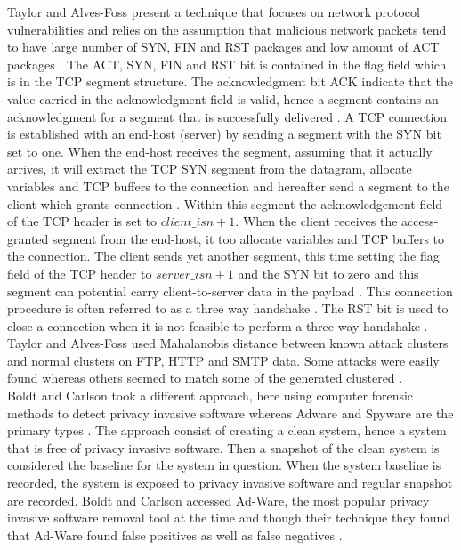 \documentclass[12pt]{article} %
\begin{document}
Taylor and Alves-Foss present a technique that focuses on network protocol vulnerabilities and relies on the assumption that malicious network packets tend to have large number of SYN, FIN and RST packages and low amount of ACT packages \cite{idika2007survey}. The ACT, SYN, FIN and RST bit is contained in the flag field which is in the TCP segment structure. The acknowledgment bit ACK indicate that the value carried in the acknowledgment field is valid, hence a segment contains an acknowledgment for a segment that is successfully delivered \cite{kurose2010computer}. A TCP connection is established with an end-host (server) by sending a segment with the SYN bit set to one. When the end-host receives the segment, assuming that it actually arrives, it will extract the TCP SYN segment from the datagram, allocate variables and TCP buffers to the connection and hereafter send a segment to the client which grants connection \cite{kurose2010computer}.  Within this segment the acknowledgement field of the TCP header is set to $client\_isn+1$. When the client receives the access-granted segment from the end-host, it too allocate variables and TCP buffers to the connection. The client sends yet another segment, this time setting the flag field of the TCP header to $server\_isn+1$ and the SYN bit to zero and this segment can potential carry client-to-server data in the payload \cite{kurose2010computer}. This connection procedure is often referred to as a three way handshake \cite{kurose2010computer}. The RST bit is used  to close a connection when it is not feasible to perform a three way handshake \cite{deri2000practical}. Taylor and Alves-Foss used Mahalanobis distance between known attack clusters and normal clusters on FTP, HTTP and SMTP data. Some attacks were easily found whereas others seemed to match some of the generated clustered \cite{idika2007survey}. \\
Boldt and Carlson took a different approach, here using computer forensic methods to detect privacy invasive software whereas Adware and Spyware are the primary types \cite{idika2007survey}. The approach consist of creating a clean system, hence a system that is free of privacy invasive software. Then a snapshot of the clean system is considered the baseline for the system in question. When the system baseline is recorded, the system is exposed to privacy invasive software and regular snapshot are recorded. Boldt and Carlson accessed Ad-Ware, the most popular privacy invasive software removal tool at the time and though their technique they found that Ad-Ware found false positives as well as false negatives \cite{idika2007survey}. \\
\end{document}
